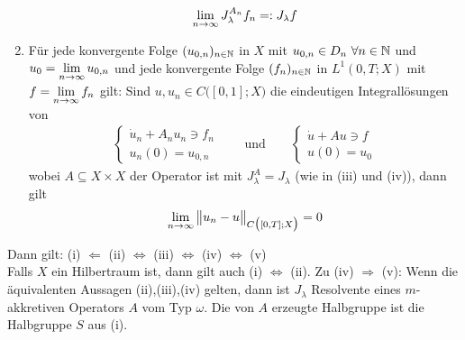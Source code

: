\begin{theorem}
\begin{enumerate}[label=(\roman*)]
\begin{align*}
			\lim\limits_{n\to\infty} J_\lambda^{A_n}f_n=:J_\lambda f
		\end{align*}
		\item Für jede konvergente Folge $(u_{0,n})_{n\in\mathbb{N}}$ in $X$ mit $u_{0,n}\in D_n~\forall n\in\mathbb{N}$ und\\ $u_0=\lim\limits_{n\to\infty} u_{0,n}$ und jede konvergente Folge $(f_n)_{n\in\mathbb{N}}$ in $L^1(0,T;X)$ mit $f=\lim\limits_{n\to\infty} f_n$ gilt:
		Sind $u,u_n\in C\big([0,1];X\big)$ die eindeutigen Integrallösungen von
		\begin{align*}
			\left\lbrace\begin{array}{r}
				\dot{u}_n+A_n u_n\ni f_n\\
				u_n(0)=u_{0,n}
			\end{array}\right.\qquad\text{und}\qquad
			\left\lbrace\begin{array}{r}
				\dot{u}+A u\ni f\\
				u(0)=u_{0}
			\end{array}\right.
		\end{align*}
		wobei $A\subseteq X\times X$ der Operator ist mit $J_\lambda^A=J_\lambda$ (wie in (iii) und (iv)), dann gilt
		\begin{align*}
			\lim\limits_{n\to\infty}\big\Vert u_n-u\big\Vert_{C\big([0,T];X\big)}=0
		\end{align*}
	\end{enumerate}
	Dann gilt: (i) $\Longleftarrow$ (ii) $\Longleftrightarrow$ (iii) $\Longleftrightarrow$ (iv) $\Longleftrightarrow$ (v)\\
	Falls $X$ ein Hilbertraum ist, dann gilt auch (i) $\Longleftrightarrow$ (ii).\nl
	Zu (iv) $\Longrightarrow$ (v): Wenn die äquivalenten Aussagen (ii),(iii),(iv) gelten, dann ist $J_\lambda$ Resolvente eines $m$-akkretiven Operators $A$ vom Typ $\omega$. Die von $A$ erzeugte Halbgruppe ist die Halbgruppe $S$ aus (i).
\end{theorem}

